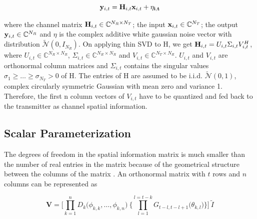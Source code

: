 \documentclass[conference]{IEEEtran}
\begin{document}
\vspace{-1pt}

\begin{equation}
{\bf y}_{i,t} = {\bf H}_{i,t} {\bf x}_{i,t}+ \bf{\eta_{i,t}}
\end{equation}

\vspace{-1pt}

where the channel matrix ${\bf H}_{i,t} \in \mathbb{C}^{N_R \times N_T}$; the input ${\bf x}_{i,t} \in \mathbb{C}^{N_T}$; the output ${\bf y}_{i,t} \in \mathbb{C}^{N_R}$ and $\eta$ is the complex additive white gaussian noise vector with distribution $\tilde{\mathcal{N}}(0,I_{N_R})$. On applying thin SVD to H, we get ${\bf H}_{i,t} = U_{i,t} \Sigma_{i,t} V_{i,t}^{H}$, where $U_{i,t} \in \mathbb{C}^{N_R \times N_R}$, $\Sigma_{i,t} \in \mathbb{C}^{N_R \times N_R}$  and $V_{i,t} \in \mathbb{C}^{N_T \times N_R}$. $U_{i,t}$ and $V_{i,t}$ are orthonormal column matrices and $\Sigma_{i,t}$ contains the singular values $\sigma_1 \geq \ldots \geq \sigma_{N_T} > 0$ of H. The entries of H are assumed to be i.i.d. $\tilde{\mathcal{N}}(0,1)$, complex circularly symmetric Gaussian with mean zero and variance 1. Therefore, the first n column vectors of $V_{i,t}$ have to be quantized and fed back to the transmitter as channel spatial information.


\subsection{Scalar Parameterization}
\label{givens}

The degrees of freedom in the spatial information matrix is much smaller than the number of real entries in the matrix because of the geometrical structure between the columns of the matrix \cite{4114278}. An orthonormal matrix with $t$ rows and $n$ columns can be represented as



\begin{equation}
\textbf{V} = \Bigg[\prod_{k=1}^{n} D_{k} \big( \phi_{k,k},\ldots , \phi_{k,n} \big) \: \Bigg\{ \prod_{l=1}^{l=t-k} G_{t-l,t-l+1} \big( \theta_{k,l}\big) \Bigg\} \Bigg] \: \tilde{I}
\end{equation}
\end{document}
